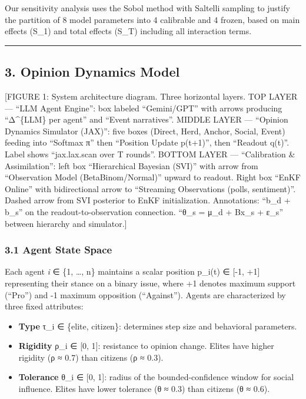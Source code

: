 \documentclass[
]{article}
\providecommand{\tightlist}{%
  \setlength{\itemsep}{0pt}\setlength{\parskip}{0pt}}
\begin{document}
Our sensitivity analysis uses the Sobol method with Saltelli sampling to
justify the partition of 8 model parameters into 4 calibrable and 4
frozen, based on main effects (S\_1) and total effects (S\_T) including
all interaction terms.

\begin{center}\rule{0.5\linewidth}{0.5pt}\end{center}

\subsection{3. Opinion Dynamics Model}\label{opinion-dynamics-model}

{[}FIGURE 1: System architecture diagram. Three horizontal layers. TOP
LAYER --- ``LLM Agent Engine'': box labeled ``Gemini/GPT'' with arrows
producing ``Δ\^{}\{LLM\} per agent'' and ``Event narratives''. MIDDLE
LAYER --- ``Opinion Dynamics Simulator (JAX)'': five boxes (Direct,
Herd, Anchor, Social, Event) feeding into ``Softmax π'' then ``Position
Update p(t+1)'', then ``Readout q(t)''. Label shows ``jax.lax.scan over
T rounds''. BOTTOM LAYER --- ``Calibration \& Assimilation'': left box
``Hierarchical Bayesian (SVI)'' with arrow from ``Observation Model
(BetaBinom/Normal)'' upward to readout. Right box ``EnKF Online'' with
bidirectional arrow to ``Streaming Observations (polls, sentiment)''.
Dashed arrow from SVI posterior to EnKF initialization. Annotations:
``b\_d + b\_s'' on the readout-to-observation connection. ``θ\_s = μ\_d
+ Bx\_s + ε\_s'' between hierarchy and simulator.{]}

\subsubsection{3.1 Agent State Space}\label{agent-state-space}

Each agent \emph{i} ∈ \{1, \ldots, n\} maintains a scalar position
p\_i(t) ∈ {[}-1, +1{]} representing their stance on a binary issue,
where +1 denotes maximum support (``Pro'') and -1 maximum opposition
(``Against''). Agents are characterized by three fixed attributes:

\begin{itemize}
\tightlist
\item
  \textbf{Type} τ\_i ∈ \{elite, citizen\}: determines step size and
  behavioral parameters.
\item
  \textbf{Rigidity} ρ\_i ∈ {[}0, 1{]}: resistance to opinion change.
  Elites have higher rigidity (ρ ≈ 0.7) than citizens (ρ ≈ 0.3).
\item
  \textbf{Tolerance} θ\_i ∈ {[}0, 1{]}: radius of the bounded-confidence
  window for social influence. Elites have lower tolerance (θ ≈ 0.3)
  than citizens (θ ≈ 0.6).
\end{itemize}
\end{document}
